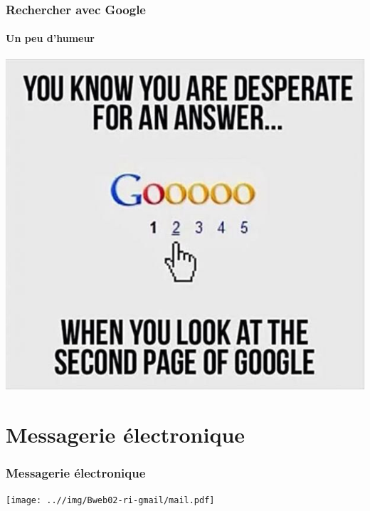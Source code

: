 \documentclass[xcolor=table]{beamer}
\begin{document}
\begin{frame}
\frametitle{Rechercher avec Google}
\framesubtitle{Un peu d'humeur}

\begin{center}
	\includegraphics[height=.8\textheight]{..//img/Bweb02-ri-gmail/google-humour.jpg}
\end{center}

\end{frame}


\section{Messagerie électronique}

\begin{frame}
\frametitle{Messagerie électronique}

\begin{center}
	\texttt{[image: ..//img/Bweb02-ri-gmail/mail.pdf]}
\end{center}

\end{frame}
\end{document}
